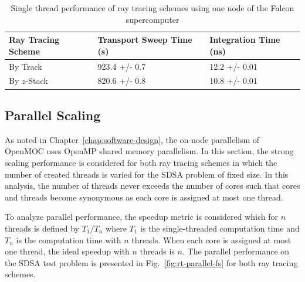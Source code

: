 \begin{table}[ht]
	\centering
	\caption{Single thread performance of ray tracing schemes using one node of the Falcon supercomputer}
	\medskip
	\begin{tabular}{l|l|l}
		\hline
	    Ray Tracing Scheme & Transport Sweep Time (s) & Integration Time (ns) \\
		\hline
		By Track & 923.4 +/- 0.7 & 12.2 +/- 0.01 \\
		By $z$-Stack & 820.6 +/- 0.8 & 10.8 +/- 0.01 \\
		\hline
	\end{tabular}
	\label{tab:rt-single-thread}
\end{table}

\subsection{Parallel Scaling}

As noted in Chapter~\ref{chap:software-design}, the on-node parallelism of OpenMOC uses OpenMP shared memory parallelism. In this section, the strong scaling performance is considered for both ray tracing schemes in which the number of created threads is varied for the SDSA problem of fixed size. In this analysis, the number of threads never exceeds the number of cores such that cores and threads become synonymous as each core is assigned at most one thread. 

To analyze parallel performance, the speedup metric is considered which for $n$ threads is defined by $T_1 / T_n$ where $T_1$ is the single-threaded computation time and $T_n$ is the computation time with $n$ threads. When each core is assigned at most one thread, the ideal speedup with $n$ threads is $n$. The parallel performance on the SDSA test problem is presented in Fig.~\ref{fig:rt-parallel-fs} for both ray tracing schemes.

